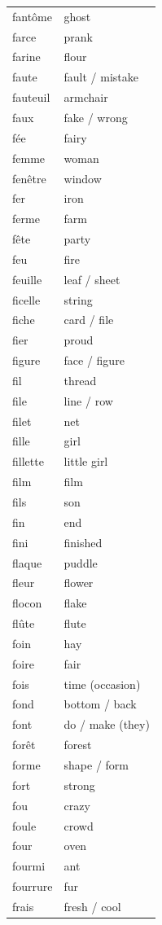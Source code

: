 \documentclass[12pt,a4paper]{article}
\begin{document}
\begin{longtable}{p{4cm} p{6cm}}
fantôme & ghost \\
farce & prank \\
farine & flour \\
faute & fault / mistake \\
fauteuil & armchair \\
faux & fake / wrong \\
fée & fairy \\
femme & woman \\
fenêtre & window \\
fer & iron \\
ferme & farm \\
fête & party \\
feu & fire \\
feuille & leaf / sheet \\
ficelle & string \\
fiche & card / file \\
fier & proud \\
figure & face / figure \\
fil & thread \\
file & line / row \\
filet & net \\
fille & girl \\
fillette & little girl \\
film & film \\
fils & son \\
fin & end \\
fini & finished \\
flaque & puddle \\
fleur & flower \\
flocon & flake \\
flûte & flute \\
foin & hay \\
foire & fair \\
fois & time (occasion) \\
fond & bottom / back \\
font & do / make (they) \\
forêt & forest \\
forme & shape / form \\
fort & strong \\
fou & crazy \\
foule & crowd \\
four & oven \\
fourmi & ant \\
fourrure & fur \\
frais & fresh / cool \\

\end{longtable}
\end{document}
